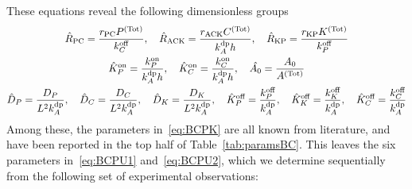 \documentclass[11pt]{article}
\newcommand{\6}[1]{#1_{\text{6}}}
\newcommand{\3}[1]{#1_{\text{3}}}
\newcommand{\Tot}[1]{#1^\text{(Tot)}}
\newcommand{\A}[1]{#1_A}
\begin{document}
These equations reveal the following dimensionless groups
\begin{subequations}
\label{eq:BCparams}
\begin{gather}
\label{eq:BCPU1}
\hat{R}_\text{PC}=\frac{r_\text{PC} \Tot{P}}{\koff_C},\quad \hat{R}_\text{ACK}=\frac{r_\text{ACK}\Tot{C}}{\kdp_A h},\quad \hat{R}_\text{KP}=\frac{r_\text{KP}\Tot{K}}{\koff_P}\\ 
\label{eq:BCPU2}
\KhatonP=\frac{{\kon_P}}{\A{\kdp} h },\quad \KhatonC=\frac{{\kon_C}}{\A{\kdp} h }, \quad \hat{A_0}=\frac{A_0}{\Tot{A}}\\
\label{eq:BCPK}
\DhatP =\frac{D_P}{L^2 \A{\kdp}}, \quad \DhatC =\frac{D_C}{L^2 \A{\kdp}}, \quad  \DhatK =\frac{D_K}{L^2 \A{\kdp}},\quad \KhatoffP = \frac{\koff_P}{\kdp_A},\quad \KhatoffK = \frac{\koff_K}{\kdp_A},\quad \KhatoffC = \frac{\koff_C}{\kdp_A}
\end{gather}
\end{subequations}
Among these, the parameters in\ \eqref{eq:BCPK} are all known from literature, and have been reported in the top half of Table\ \ref{tab:paramsBC}. This leaves the six parameters in\ \eqref{eq:BCPU1} and\ \eqref{eq:BCPU2}, which we determine sequentially from the following set of experimental observations:
\end{document}
